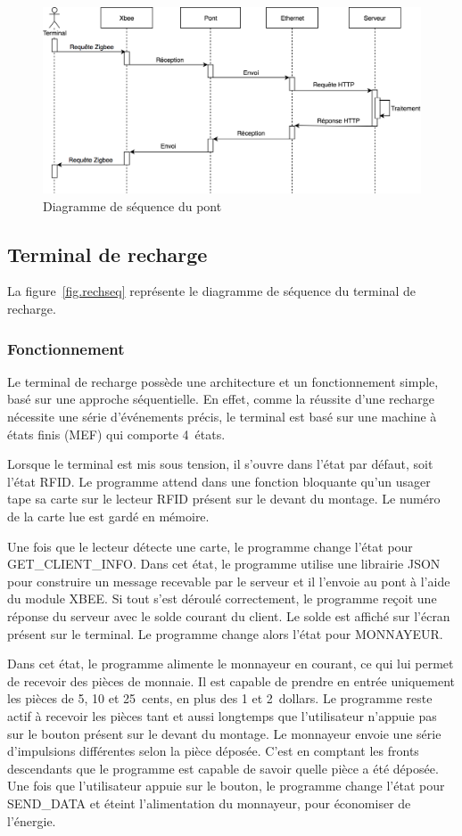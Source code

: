 		\begin{figure}[p]
			\includegraphics[width=\textwidth]{Pictures/UML/reseauSequence}
			\caption{Diagramme de séquence du pont}
			\label{fig.pontseq}
		\end{figure}
	
	\subsection{Terminal de recharge}
	La figure~\ref{fig.rechseq} représente le diagramme de séquence du terminal de recharge.
		\subsubsection{Fonctionnement}
		Le terminal de recharge possède une architecture et un fonctionnement simple, basé sur une approche séquentielle. En effet, comme la réussite d’une recharge nécessite une série d'événements précis, le terminal est basé sur une machine à états finis (MEF) qui comporte 4~états. 

		Lorsque le terminal est mis sous tension, il s’ouvre dans l’état par défaut, soit l’état RFID. Le programme attend dans une fonction bloquante qu’un usager tape sa carte sur le lecteur RFID présent sur le devant du montage. Le numéro de la carte lue est gardé en mémoire.

		Une fois que le lecteur détecte une carte, le programme change l’état pour GET\_CLIENT\_INFO. Dans cet état, le programme utilise une librairie JSON pour construire un message recevable par le serveur et il l'envoie au pont à l’aide du module XBEE. Si tout s’est déroulé correctement, le programme reçoit une réponse du serveur avec le solde courant du client. Le solde est affiché sur l’écran présent sur le terminal. Le programme change alors l’état pour MONNAYEUR.

		Dans cet état, le programme alimente le monnayeur en courant, ce qui lui permet de recevoir des pièces de monnaie. Il est capable de prendre en entrée uniquement les pièces de 5, 10 et 25~cents, en plus des 1 et 2~dollars. Le programme reste actif à recevoir les pièces tant et aussi longtemps que l’utilisateur n’appuie pas sur le bouton présent sur le devant du montage. Le monnayeur envoie une série d’impulsions différentes selon la pièce déposée. C’est en comptant les fronts descendants que le programme est capable de savoir quelle pièce a été déposée. Une fois que l’utilisateur appuie sur le bouton, le programme change l’état pour SEND\_DATA et éteint l’alimentation du monnayeur, pour économiser de l’énergie. 

